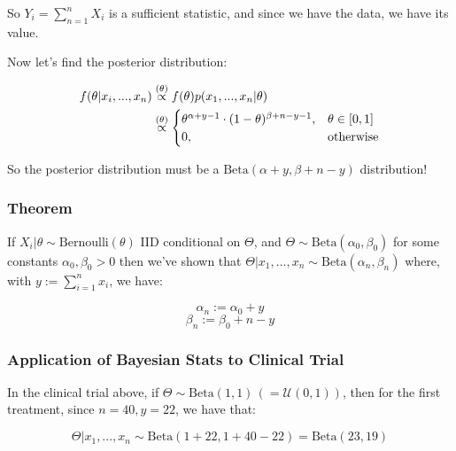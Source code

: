 \documentclass[a4paper]{article}
\begin{document}
                So $Y_i = \sum\limits_{n=1}^n X_i$ is a sufficient statistic,
                and since we have the data, we have its value.

                Now let's find the posterior distribution:

                \begin{align*}
                    f(\theta | x_i, ..., x_n) & \stackrel{({\theta})}{\propto} f(\theta)
                        p(x_1, ..., x_n | \theta) \\
                    & \stackrel{({\theta})}{\propto} \begin{cases}\theta^{\alpha + y -1} \cdot
                        (1 - \theta)^{\beta + n - y - 1}, & \theta \in [0, 1] \\
                        0, & \text{otherwise}\end{cases} \\
                \end{align*}

                So the posterior distribution must be a $\text{Beta}(\alpha + y,
                \beta + n - y)$ distribution!

            \subsubsection{Theorem}
                If $X_i | \theta \sim \text{Bernoulli}(\theta)$ IID conditional
                on $\Theta$, and $\Theta \sim \text{Beta}(\alpha_0, \beta_0)$
                for some constants $\alpha_0, \beta_0 > 0$ then we've shown that
                $\Theta | x_1, ..., x_n \sim \text{Beta}(\alpha_n, \beta_n)$
                where, with $y := \sum\limits_{i=1}^n x_i$, we have:

                \[
                    \alpha_n := \alpha_0 + y
                \]
                \[
                    \beta_n := \beta_0 + n - y
                \]

            \subsubsection{Application of Bayesian Stats to Clinical Trial}
                In the clinical trial above, if $\Theta \sim
                \text{Beta}(1, 1) \, (= \mathcal{U}(0, 1))$, then for the first
                treatment, since $n = 40, y = 22$, we have that:

                \[
                    \Theta | x_1, ..., x_n \sim \text{Beta}(1 + 22, 1 + 40 - 22)
                    = \text{Beta}(23, 19)
                \]
\end{document}
